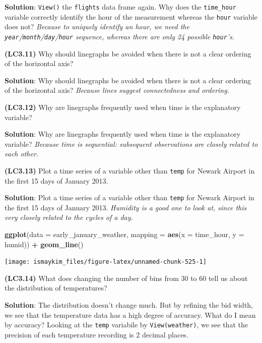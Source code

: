 \documentclass[12pt,]{krantz}
\makeatletter
\newenvironment{Shaded}{\begin{snugshade}}{\end{snugshade}}
\newcommand{\KeywordTok}[1]{\textcolor[rgb]{0.27,0.27,0.27}{\textbf{#1}}}
\newcommand{\DataTypeTok}[1]{\textcolor[rgb]{0.27,0.27,0.27}{#1}}
\newcommand{\StringTok}[1]{\textcolor[rgb]{0.5,0.5,0.5}{#1}}
\newcommand{\OperatorTok}[1]{\textcolor[rgb]{0.43,0.43,0.43}{\textbf{#1}}}
\newcommand{\NormalTok}[1]{#1}
\newenvironment{kframe}{%
\medskip{}
\setlength{\fboxsep}{.8em}
 \def\at@end@of@kframe{}%
 \ifinner\ifhmode%
  \def\at@end@of@kframe{\end{minipage}}%
  \begin{minipage}{\columnwidth}%
 \fi\fi%
 \def\FrameCommand##1{\hskip\@totalleftmargin \hskip-\fboxsep
 \colorbox{shadecolor}{##1}\hskip-\fboxsep
     \hskip-\linewidth \hskip-\@totalleftmargin \hskip\columnwidth}%
 \MakeFramed {\advance\hsize-\width
   \@totalleftmargin\z@ \linewidth\hsize
   \@setminipage}}%
 {\par\unskip\endMakeFramed%
 \at@end@of@kframe}
\renewenvironment{Shaded}{\begin{kframe}}{\end{kframe}}
\theoremstyle{definition}
\theoremstyle{definition}
\theoremstyle{definition}
\theoremstyle{remark}
\makeatother
\begin{document}
\textbf{Solution}: \texttt{View()} the \texttt{flights} data frame
again. Why does the \texttt{time\_hour} variable correctly identify the
hour of the measurement whereas the \texttt{hour} variable does not?
\emph{Because to uniquely identify an hour, we need the
\texttt{year}/\texttt{month}/\texttt{day}/\texttt{hour} sequence,
whereas there are only 24 possible \texttt{hour}'s.}

\textbf{(LC3.11)} Why should linegraphs be avoided when there is not a
clear ordering of the horizontal axis?

\textbf{Solution}: Why should linegraphs be avoided when there is not a
clear ordering of the horizontal axis? \emph{Because lines suggest
connectedness and ordering.}

\textbf{(LC3.12)} Why are linegraphs frequently used when time is the
explanatory variable?

\textbf{Solution}: Why are linegraphs frequently used when time is the
explanatory variable? \emph{Because time is sequential: subsequent
observations are closely related to each other.}

\textbf{(LC3.13)} Plot a time series of a variable other than
\texttt{temp} for Newark Airport in the first 15 days of January 2013.

\textbf{Solution}: Plot a time series of a variable other than
\texttt{temp} for Newark Airport in the first 15 days of January 2013.
\emph{Humidity is a good one to look at, since this very closely related
to the cycles of a day.}

\begin{Shaded}
\begin{Highlighting}[]
\KeywordTok{ggplot}\NormalTok{(}\DataTypeTok{data =}\NormalTok{ early_january_weather, }\DataTypeTok{mapping =} \KeywordTok{aes}\NormalTok{(}\DataTypeTok{x =}\NormalTok{ time_hour, }\DataTypeTok{y =}\NormalTok{ humid)) }\OperatorTok{+}
\StringTok{  }\KeywordTok{geom_line}\NormalTok{()}
\end{Highlighting}
\end{Shaded}

\begin{center}\texttt{[image: ismaykim\_files/figure-latex/unnamed-chunk-525-1]} \end{center}

\textbf{(LC3.14)} What does changing the number of bins from 30 to 60
tell us about the distribution of temperatures?

\textbf{Solution}: The distribution doesn't change much. But by refining
the bid width, we see that the temperature data has a high degree of
accuracy. What do I mean by accuracy? Looking at the \texttt{temp}
variabile by \texttt{View(weather)}, we see that the precision of each
temperature recording is 2 decimal places.
\end{document}
